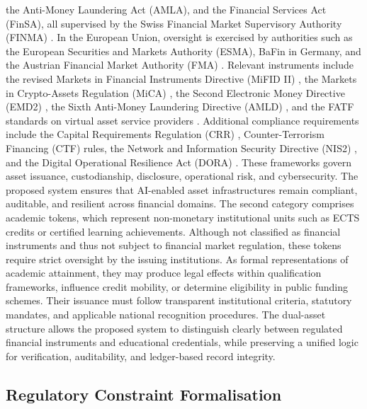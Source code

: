 \documentclass[oneside,10pt]{swissi}
\begin{document}
the Anti-Money Laundering Act (AMLA), and the Financial Services Act (FinSA), all supervised by the Swiss Financial Market Supervisory Authority (FINMA) \cite{ch2016fima, ch2021amla, ch2018finsa, finma2024}. In the European Union, oversight is exercised by authorities such as the European Securities and Markets Authority (ESMA), BaFin in Germany, and the Austrian Financial Market Authority (FMA) \cite{esma2024, bafin2024, fma2024}. Relevant instruments include the revised Markets in Financial Instruments Directive (MiFID II) \cite{eu2014mifid2}, the Markets in Crypto-Assets Regulation (MiCA) \cite{eu2023mica}, the Second Electronic Money Directive (EMD2) \cite{eu2009emd2}, the Sixth Anti-Money Laundering Directive (AMLD) \cite{eu2018amld6}, and the FATF standards on virtual asset service providers \cite{fatf2023guidance}. Additional compliance requirements include the Capital Requirements Regulation (CRR) \cite{eu2013crr}, Counter-Terrorism Financing (CTF) rules, the Network and Information Security Directive (NIS2) \cite{eu2022nis2}, and the Digital Operational Resilience Act (DORA) \cite{eu2022dora}. These frameworks govern asset issuance, custodianship, disclosure, operational risk, and cybersecurity. The proposed system ensures that AI-enabled asset infrastructures remain compliant, auditable, and resilient across financial domains. The second category comprises academic tokens, which represent non-monetary institutional units such as ECTS credits or certified learning achievements. Although not classified as financial instruments and thus not subject to financial market regulation, these tokens require strict oversight by the issuing institutions. As formal representations of academic attainment, they may produce legal effects within qualification frameworks, influence credit mobility, or determine eligibility in public funding schemes. Their issuance must follow transparent institutional criteria, statutory mandates, and applicable national recognition procedures. The dual-asset structure allows the proposed system to distinguish clearly between regulated financial instruments and educational credentials, while preserving a unified logic for verification, auditability, and ledger-based record integrity.

\subsection{Regulatory Constraint Formalisation}
\end{document}
